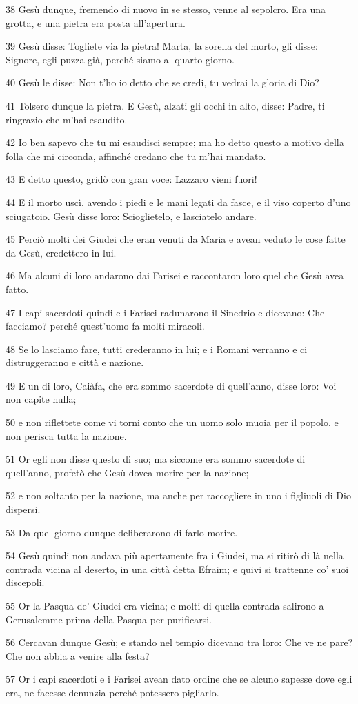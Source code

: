 \par 38 Gesù dunque, fremendo di nuovo in se stesso, venne al sepolcro. Era una grotta, e una pietra era posta all'apertura.
\par 39 Gesù disse: Togliete via la pietra! Marta, la sorella del morto, gli disse: Signore, egli puzza già, perché siamo al quarto giorno.
\par 40 Gesù le disse: Non t'ho io detto che se credi, tu vedrai la gloria di Dio?
\par 41 Tolsero dunque la pietra. E Gesù, alzati gli occhi in alto, disse: Padre, ti ringrazio che m'hai esaudito.
\par 42 Io ben sapevo che tu mi esaudisci sempre; ma ho detto questo a motivo della folla che mi circonda, affinché credano che tu m'hai mandato.
\par 43 E detto questo, gridò con gran voce: Lazzaro vieni fuori!
\par 44 E il morto uscì, avendo i piedi e le mani legati da fasce, e il viso coperto d'uno sciugatoio. Gesù disse loro: Scioglietelo, e lasciatelo andare.
\par 45 Perciò molti dei Giudei che eran venuti da Maria e avean veduto le cose fatte da Gesù, credettero in lui.
\par 46 Ma alcuni di loro andarono dai Farisei e raccontaron loro quel che Gesù avea fatto.
\par 47 I capi sacerdoti quindi e i Farisei radunarono il Sinedrio e dicevano: Che facciamo? perché quest'uomo fa molti miracoli.
\par 48 Se lo lasciamo fare, tutti crederanno in lui; e i Romani verranno e ci distruggeranno e città e nazione.
\par 49 E un di loro, Caiàfa, che era sommo sacerdote di quell'anno, disse loro: Voi non capite nulla;
\par 50 e non riflettete come vi torni conto che un uomo solo muoia per il popolo, e non perisca tutta la nazione.
\par 51 Or egli non disse questo di suo; ma siccome era sommo sacerdote di quell'anno, profetò che Gesù dovea morire per la nazione;
\par 52 e non soltanto per la nazione, ma anche per raccogliere in uno i figliuoli di Dio dispersi.
\par 53 Da quel giorno dunque deliberarono di farlo morire.
\par 54 Gesù quindi non andava più apertamente fra i Giudei, ma si ritirò di là nella contrada vicina al deserto, in una città detta Efraim; e quivi si trattenne co' suoi discepoli.
\par 55 Or la Pasqua de' Giudei era vicina; e molti di quella contrada salirono a Gerusalemme prima della Pasqua per purificarsi.
\par 56 Cercavan dunque Gesù; e stando nel tempio dicevano tra loro: Che ve ne pare? Che non abbia a venire alla festa?
\par 57 Or i capi sacerdoti e i Farisei avean dato ordine che se alcuno sapesse dove egli era, ne facesse denunzia perché potessero pigliarlo.

